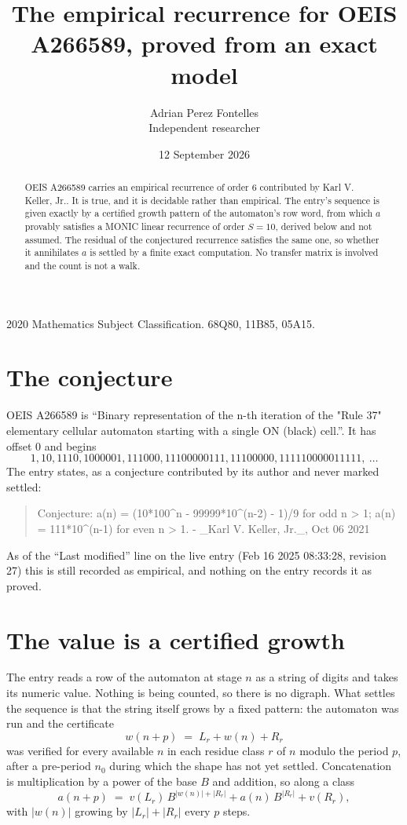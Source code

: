 \documentclass[11pt,a4paper]{article}
\title{The empirical recurrence for OEIS A266589, proved from an exact model}
\author{Adrian Perez Fontelles\\ \small Independent researcher}
\date{12 September 2026}
\theoremstyle{plain}
\theoremstyle{definition}
\begin{document}
\maketitle

\begin{abstract}
OEIS A266589 carries an empirical recurrence of order $6$ contributed by Karl V. Keller, Jr.. It is true, and it is
decidable rather than empirical. The entry's sequence is given exactly by a certified growth pattern of the automaton's row word, from
which $a$ provably satisfies a MONIC linear recurrence of order $S=10$, derived below and not
assumed. The residual of the conjectured recurrence satisfies the same one, so whether it
annihilates $a$ is settled by a finite exact computation. No transfer matrix is involved and
the count is not a walk.
\end{abstract}

\noindent\small 2020 Mathematics Subject Classification. 68Q80, 11B85, 05A15.\normalsize

\section{The conjecture}

OEIS A266589 is ``Binary representation of the n-th iteration of the "Rule 37" elementary cellular automaton starting with a single ON (black) cell.''. It has offset $0$ and begins
\[
1, 10, 1110, 1000001, 111000, 11100000111, 11100000, 111110000011111,\ \dots
\]
The entry states, as a conjecture contributed by its author and never marked settled:
\begin{quote}
Conjecture: a(n) = (10*100\^{}n - 99999*10\^{}(n-2) - 1)/9 for odd n > 1; a(n) = 111*10\^{}(n-1) for even n > 1. - \_Karl V. Keller, Jr.\_, Oct 06 2021
\end{quote}
As of the ``Last modified'' line on the live entry (Feb 16 2025 08:33:28, revision 27)
this is still recorded as empirical, and nothing on the entry records it as proved.

\section{The value is a certified growth}

The entry reads a row of the automaton at stage $n$ as a string of digits and takes its
numeric value. Nothing is being counted, so there is no digraph. What settles the sequence is
that the string itself grows by a fixed pattern: the automaton was run and the certificate
\[
w(n+p)\;=\;L_r + w(n) + R_r
\]
was verified for every available $n$ in each residue class $r$ of $n$ modulo the period $p$,
after a pre-period $n_0$ during which the shape has not yet settled. Concatenation is
multiplication by a power of the base $B$ and addition, so along a class
\[
a(n+p)\;=\;v(L_r)\,B^{|w(n)|+|R_r|} + a(n)\,B^{|R_r|} + v(R_r),
\]
with $|w(n)|$ growing by $|L_r|+|R_r|$ every $p$ steps.
\end{document}
